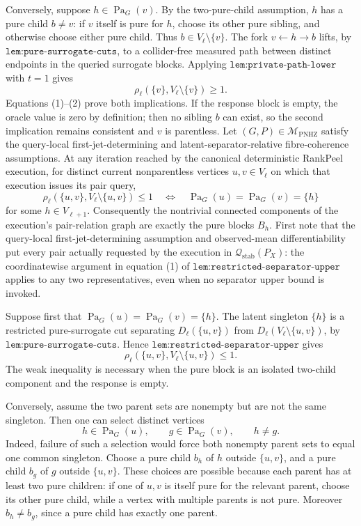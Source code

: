Conversely, suppose \(h\in\operatorname{Pa}_G(v)\).  By the two-pure-child assumption, \(h\) has a pure child \(b\neq v\): if \(v\) itself is pure for \(h\), choose its other pure sibling, and otherwise choose either pure child.  Thus \(b\in V_\ell\setminus\{v\}\).  The fork \(v\leftarrow h\to b\) lifts, by \(\texttt{lem:pure-surrogate-cuts}\), to a collider-free measured path between distinct endpoints in the queried surrogate blocks.  Applying \(\texttt{lem:private-path-lower}\) with \(t=1\) gives
\[
 \rho_\ell(\{v\},V_\ell\setminus\{v\})\geq1. \tag{2}
\]
Equations (1)--(2) prove both implications.  If the response block is empty, the oracle value is zero by definition; then no sibling \(b\) can exist, so the second implication remains consistent and \(v\) is parentless.
Let \((G,P)\in\mathcal M_{\mathrm{PNHZ}}\) satisfy the query-local first-jet-determining and latent-separator-relative fibre-coherence assumptions.  At any iteration reached by the canonical deterministic RankPeel execution, for distinct current nonparentless vertices \(u,v\in V_\ell\) on which that execution issues its pair query,
\[
 \rho_\ell(\{u,v\},V_\ell\setminus\{u,v\})\leq1
 \quad\Longleftrightarrow\quad
 \operatorname{Pa}_G(u)=\operatorname{Pa}_G(v)=\{h\}
\]
for some \(h\in V_{\ell+1}\).  Consequently the nontrivial connected components of the execution's pair-relation graph are exactly the pure blocks \(B_h\).
First note that the query-local first-jet-determining assumption and observed-mean differentiability put every pair actually requested by the execution in \(\mathcal Q_{\mathrm{stab}}(P_X)\): the coordinatewise argument in equation (1) of \(\texttt{lem:restricted-separator-upper}\) applies to any two representatives, even when no separator upper bound is invoked.

Suppose first that \(\operatorname{Pa}_G(u)=\operatorname{Pa}_G(v)=\{h\}\).  The latent singleton \(\{h\}\) is a restricted pure-surrogate cut separating \(D_\ell(\{u,v\})\) from \(D_\ell(V_\ell\setminus\{u,v\})\), by \(\texttt{lem:pure-surrogate-cuts}\).  Hence \(\texttt{lem:restricted-separator-upper}\) gives
\[
 \rho_\ell(\{u,v\},V_\ell\setminus\{u,v\})\leq1. \tag{1}
\]
The weak inequality is necessary when the pure block is an isolated two-child component and the response is empty.

Conversely, assume the two parent sets are nonempty but are not the same singleton.  Then one can select distinct vertices
\[
 h\in\operatorname{Pa}_G(u),
 \qquad
 g\in\operatorname{Pa}_G(v),
 \qquad h\neq g. \tag{2}
\]
Indeed, failure of such a selection would force both nonempty parent sets to equal one common singleton.  Choose a pure child \(b_h\) of \(h\) outside \(\{u,v\}\), and a pure child \(b_g\) of \(g\) outside \(\{u,v\}\).  These choices are possible because each parent has at least two pure children: if one of \(u,v\) is itself pure for the relevant parent, choose its other pure child, while a vertex with multiple parents is not pure.  Moreover \(b_h\neq b_g\), since a pure child has exactly one parent.

